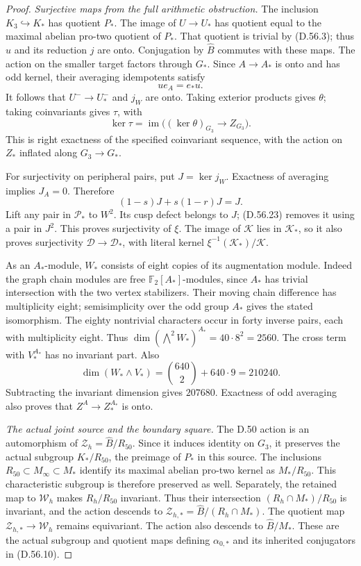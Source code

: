 \begin{proof}
\emph{Surjective maps from the full arithmetic obstruction.}
The inclusion \(K_3\hookrightarrow K_*\) has quotient
\(P_*\). The image of \(U\to U_*\) has quotient equal
to the maximal abelian pro-two quotient of \(P_*\).
That quotient is trivial by (D.56.3); thus \(u\)
and its reduction \(j\) are onto.
Conjugation by \(\widehat B\) commutes with these maps.
The action on the smaller target factors through
\(G_*\).
Since \(A\to A_*\) is onto and has odd kernel, their
averaging idempotents satisfy
\[
                       u e_A=e_*u .
 \tag{D.56.21}
\]
It follows that \(U^-\to U_*^-\) and \(j_W\) are onto.
Taking exterior products gives \(\theta\);
taking coinvariants gives \(\tau\), with
\[
       \ker\tau
           =\operatorname{im}\bigl((\ker\theta)_{G_3}
                                    \longrightarrow Z_{G_3}\bigr).
 \tag{D.56.22}
\]
This is right exactness of the specified
coinvariant sequence, with the action on \(Z_*\)
inflated along \(G_3\to G_*\).

For surjectivity on peripheral pairs, put
\(J=\ker j_W\). Exactness of averaging implies
\(J_A=0\). Therefore
\[
     (1-s)J+s(1-r)J=J .
 \tag{D.56.23}
\]
Lift any pair in \(\mathcal P_*\) to \(W^2\).
Its cusp defect belongs to \(J\); (D.56.23)
removes it using a pair in \(J^2\).
This proves surjectivity of \(\xi\).
The image of \(\mathcal K\) lies in \(\mathcal K_*\),
so it also proves surjectivity
\(\mathscr D\to\mathscr D_*\), with literal kernel
\(\xi^{-1}(\mathcal K_*)/\mathcal K\).

As an \(A_*\)-module, \(W_*\) consists of eight
copies of its augmentation module.
Indeed the graph chain modules are free
\(\mathbb F_2[A_*]\)-modules, since \(A_*\) has
trivial intersection with the two vertex stabilizers.
Their moving chain difference has multiplicity
eight; semisimplicity over the odd group \(A_*\)
gives the stated isomorphism.
The eighty nontrivial characters occur in forty
inverse pairs, each with multiplicity eight.
Thus
\(\dim(\bigwedge^2W_*)^{A_*}=40\cdot8^2=2560\).
The cross term with \(V_*^{A_*}\) has no invariant
part. Also
\[
 \dim(W_*\wedge V_*)
    ={640\choose2}+640\cdot9=210240 .
 \tag{D.56.24}
\]
Subtracting the invariant dimension gives \(207680\).
Exactness of odd averaging also proves that
\(Z^A\to Z_*^{A_*}\) is onto.

\emph{The actual joint source and the boundary square.}
The D.50 action is an automorphism of
\(\mathcal Z_h=\widehat B/R_{50}\).
Since it induces identity on \(G_3\), it preserves
the actual subgroup \(K_*/R_{50}\), the preimage
of \(P_*\) in this source. The inclusions
\(R_{50}\subset M_\infty\subset M_*\)
identify its maximal abelian pro-two kernel as
\(M_*/R_{50}\). This characteristic subgroup is
therefore preserved as well. Separately, the
retained map to \(\mathcal W_h\) makes
\(R_h/R_{50}\) invariant. Thus their intersection
\((R_h\cap M_*)/R_{50}\) is invariant, and the
action descends to
\(\mathcal Z_{h,*}=\widehat B/(R_h\cap M_*)\).
The quotient map
\(\mathcal Z_{h,*}\to\mathcal W_h\) remains equivariant.
The action also descends to \(\widehat B/M_*\).
These are the actual subgroup and quotient maps
defining \(\alpha_{0,*}\) and its inherited
conjugators in (D.56.10).


\end{proof}
